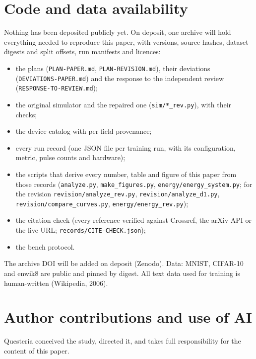 








\section{Code and data availability}\label{sec:availability}
Nothing has been deposited publicly yet. On deposit, one archive will hold everything needed to reproduce this paper, with
versions, source hashes, dataset digests and split offsets, run manifests and licences:
\begin{itemize}
\item the plans (\texttt{PLAN-PAPER.md}, \texttt{PLAN-REVISION.md}), their deviations (\texttt{DEVIATIONS-PAPER.md}) and the
      response to the independent review (\texttt{RESPONSE-TO-REVIEW.md});
\item the original simulator and the repaired one (\texttt{sim/*\_rev.py}), with their checks;
\item the device catalog with per-field provenance;
\item every run record (one JSON file per training run, with its configuration, metric, pulse counts and hardware);
\item the scripts that derive every number, table and figure of this paper from those records (\texttt{analyze.py},
      \texttt{make\_figures.py}, \texttt{energy/energy\_system.py}; for the revision \texttt{revision/analyze\_rev.py},
      \texttt{revision/analyze\_d1.py}, \texttt{revision/compare\_curves.py}, \texttt{energy/energy\_rev.py});
\item the citation check (every reference verified against Crossref, the arXiv API or the live URL;
      \texttt{records/CITE-CHECK.json});
\item the bench protocol.
\end{itemize}
The archive DOI will be added on deposit (Zenodo). Data: MNIST, CIFAR-10 and enwik8 are public and pinned by digest. All text
data used for training is human-written (Wikipedia, 2006).

\section*{Author contributions and use of AI}
\ifdefined\arxivvariant
Questeria conceived the study, directed it, and takes full responsibility for the content of this paper.

